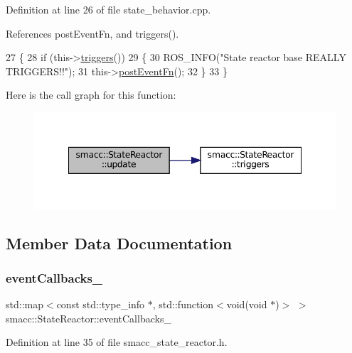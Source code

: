 Definition at line 26 of file state\+\_\+behavior.\+cpp.



References post\+Event\+Fn, and triggers().


\begin{DoxyCode}
27 \{
28     \textcolor{keywordflow}{if} (this->\hyperlink{classsmacc_1_1StateReactor_a445bc3c90980d75d7d815b85cfb68b21}{triggers}())
29     \{
30         ROS\_INFO(\textcolor{stringliteral}{"State reactor base REALLY TRIGGERS!!"});
31         this->\hyperlink{classsmacc_1_1StateReactor_a1d97ae5c1689b6716c60c19c94a7eeae}{postEventFn}();
32     \}
33 \}
\end{DoxyCode}
Here is the call graph for this function\+:
\nopagebreak
\begin{figure}[H]
\begin{center}
\leavevmode
\includegraphics[width=348pt]{classsmacc_1_1StateReactor_aca5d4f7af06532272db55943b7810a43_cgraph}
\end{center}
\end{figure}


\subsection{Member Data Documentation}
\mbox{\label{classsmacc_1_1StateReactor_a63cce05c412f3699cc1b15af9aeaf8af}} 
\subsubsection{\texorpdfstring{event\+Callbacks\+\_\+}{eventCallbacks\_}}
{\footnotesize\ttfamily std\+::map$<$const std\+::type\+\_\+info $\ast$, std\+::function$<$void(void $\ast$)$>$ $>$ smacc\+::\+State\+Reactor\+::event\+Callbacks\+\_\+}



Definition at line 35 of file smacc\+\_\+state\+\_\+reactor.\+h.



